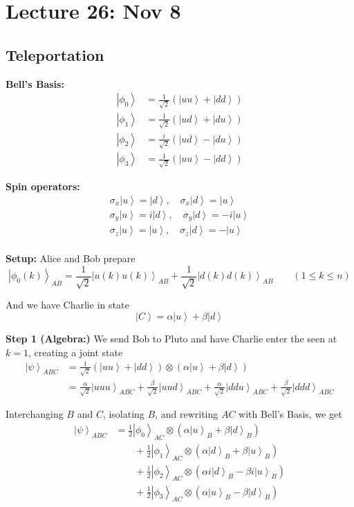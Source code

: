 \documentclass[12pt]{article}
\newcommand{\ket}[1]{\left\vert #1 \right\rangle}
\begin{document}
\section*{Lecture 26: Nov 8}
    \subsection*{Teleportation}
        \textbf{Bell's Basis:}
            \begin{align*}
                \ket{\phi_0} &= \frac{1}{\sqrt 2}(\ket{uu} + \ket{dd})\\
                \ket{\phi_1} &= \frac{1}{\sqrt 2}(\ket{ud} + \ket{du})\\
                \ket{\phi_2} &= \frac{i}{\sqrt 2}(\ket{ud} - \ket{du})\\
                \ket{\phi_3} &= \frac{1}{\sqrt 2}(\ket{uu} - \ket{dd})
            \end{align*}

        \textbf{Spin operators:}
            \begin{align*}
                \sigma_x\ket{u} = \ket{d}, \quad \sigma_x\ket{d} = \ket{u}\\
                \sigma_y\ket{u} = i\ket{d}, \quad \sigma_y\ket{d} = -i\ket{u}\\
                \sigma_z\ket{u} = \ket{u}, \quad \sigma_z\ket{d} = -\ket{u}\\
            \end{align*}

        \textbf{Setup:}
            Alice and Bob prepare 
            \[\ket{\phi_0(k)}_{AB} = \frac{1}{\sqrt 2}\ket{u(k)u(k)}_{AB} + \frac{1}{\sqrt 2}\ket{d(k)d(k)}_{AB} \qquad (1 \leq k \leq n)\]

            And we have Charlie in state 
            \[\ket{C} = \alpha\ket{u} + \beta\ket{d}\]

            \textbf{Step 1 (Algebra:)} We send Bob to Pluto and have Charlie enter the seen at $k=1$, creating a joint state
            \begin{align*}
                \ket{\psi}_{ABC} &= \frac{1}{\sqrt 2}(\ket{uu} + \ket{dd}) \otimes (\alpha\ket{u} + \beta\ket{d})\\
                    &= \frac{\alpha}{\sqrt 2}\ket{uuu}_{ABC} + \frac{\beta}{\sqrt 2}\ket{uud}_{ABC} + \frac{\alpha}{\sqrt 2}\ket{ddu}_{ABC} + \frac{\beta}{\sqrt 2}\ket{ddd}_{ABC}
            \end{align*}

            Interchanging $B$ and $C$, isolating $B$, and rewriting $AC$ with Bell's Basis, we get 
            \begin{align*}
                \ket{\psi}_{ABC} &= \frac{1}{2}\ket{\phi_0}_{AC}\otimes (\alpha\ket{u}_B + \beta\ket{d}_B)\\
                    &\qquad + \frac{1}{2}\ket{\phi_1}_{AC}\otimes (\alpha\ket{d}_B + \beta\ket{u}_B)\\
                    &\qquad + \frac{i}{2}\ket{\phi_2}_{AC}\otimes (\alpha i\ket{d}_B - \beta i\ket{u}_B)\\
                    &\qquad + \frac{1}{2}\ket{\phi_3}_{AC} \otimes (\alpha\ket{u}_B - \beta\ket{d}_B)
            \end{align*}
            
\end{document}
